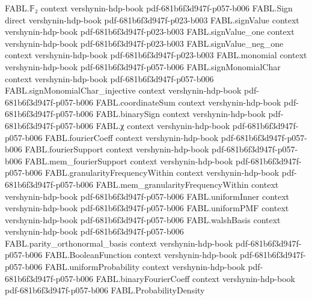 \begin{theorem}
\proofstep
  {FABL.𝔽₂}
  {context}
  {vershynin-hdp-book}
  {pdf-681b6f3d947f-p057-b006}
\proofstep
  {FABL.Sign}
  {direct}
  {vershynin-hdp-book}
  {pdf-681b6f3d947f-p023-b003}
\proofstep
  {FABL.signValue}
  {context}
  {vershynin-hdp-book}
  {pdf-681b6f3d947f-p023-b003}
\proofstep
  {FABL.signValue_one}
  {context}
  {vershynin-hdp-book}
  {pdf-681b6f3d947f-p023-b003}
\proofstep
  {FABL.signValue_neg_one}
  {context}
  {vershynin-hdp-book}
  {pdf-681b6f3d947f-p023-b003}
\proofstep
  {FABL.monomial}
  {context}
  {vershynin-hdp-book}
  {pdf-681b6f3d947f-p057-b006}
\proofstep
  {FABL.signMonomialChar}
  {context}
  {vershynin-hdp-book}
  {pdf-681b6f3d947f-p057-b006}
\proofstep
  {FABL.signMonomialChar_injective}
  {context}
  {vershynin-hdp-book}
  {pdf-681b6f3d947f-p057-b006}
\proofstep
  {FABL.coordinateSum}
  {context}
  {vershynin-hdp-book}
  {pdf-681b6f3d947f-p057-b006}
\proofstep
  {FABL.binarySign}
  {context}
  {vershynin-hdp-book}
  {pdf-681b6f3d947f-p057-b006}
\proofstep
  {FABL.χ}
  {context}
  {vershynin-hdp-book}
  {pdf-681b6f3d947f-p057-b006}
\proofstep
  {FABL.fourierCoeff}
  {context}
  {vershynin-hdp-book}
  {pdf-681b6f3d947f-p057-b006}
\proofstep
  {FABL.fourierSupport}
  {context}
  {vershynin-hdp-book}
  {pdf-681b6f3d947f-p057-b006}
\proofstep
  {FABL.mem_fourierSupport}
  {context}
  {vershynin-hdp-book}
  {pdf-681b6f3d947f-p057-b006}
\proofstep
  {FABL.granularityFrequencyWithin}
  {context}
  {vershynin-hdp-book}
  {pdf-681b6f3d947f-p057-b006}
\proofstep
  {FABL.mem_granularityFrequencyWithin}
  {context}
  {vershynin-hdp-book}
  {pdf-681b6f3d947f-p057-b006}
\proofstep
  {FABL.uniformInner}
  {context}
  {vershynin-hdp-book}
  {pdf-681b6f3d947f-p057-b006}
\proofstep
  {FABL.uniformPMF}
  {context}
  {vershynin-hdp-book}
  {pdf-681b6f3d947f-p057-b006}
\proofstep
  {FABL.walshBasis}
  {context}
  {vershynin-hdp-book}
  {pdf-681b6f3d947f-p057-b006}
\proofstep
  {FABL.parity_orthonormal_basis}
  {context}
  {vershynin-hdp-book}
  {pdf-681b6f3d947f-p057-b006}
\proofstep
  {FABL.BooleanFunction}
  {context}
  {vershynin-hdp-book}
  {pdf-681b6f3d947f-p057-b006}
\proofstep
  {FABL.uniformProbability}
  {context}
  {vershynin-hdp-book}
  {pdf-681b6f3d947f-p057-b006}
\proofstep
  {FABL.binaryFourierCoeff}
  {context}
  {vershynin-hdp-book}
  {pdf-681b6f3d947f-p057-b006}
\proofstep
  {FABL.ProbabilityDensity}

\end{theorem}
